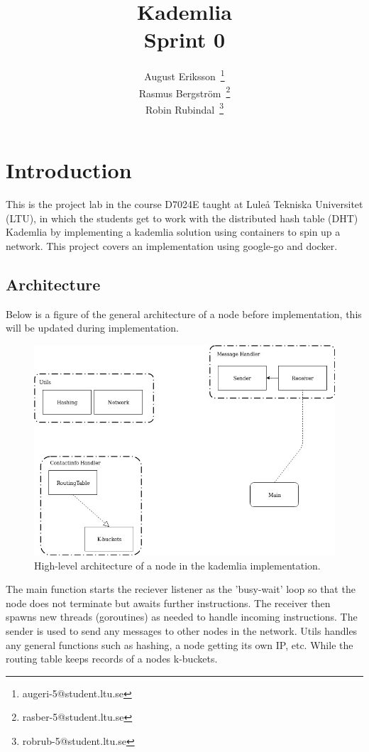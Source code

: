 \documentclass[a4paper]{article}
\title{Kademlia\\ \medskip{}
  \large{Sprint 0}
}
\author{
  August Eriksson~\thanks{augeri-5@student.ltu.se}\\
  Rasmus Bergström~\thanks{rasber-5@student.ltu.se}\\
  Robin Rubindal~\thanks{robrub-5@student.ltu.se}\\
}
\begin{document}
\maketitle
\newpage



\newpage

\section{Introduction}
This is the project lab in the course D7024E taught at Luleå Tekniska Universitet (LTU), in which the students get to work with the distributed hash table (DHT) Kademlia by implementing a kademlia solution using containers to spin up a network. This project covers an implementation using google-go and docker.

\subsection{Architecture}
Below is a figure of the general architecture of a node before implementation, this will be updated during implementation.
\begin{figure}[ht]
\centering
\includegraphics[width=\linewidth]{D7024E-architecture.jpg}
\caption{High-level architecture of a node in the kademlia implementation.}
\end{figure}

The main function starts the reciever listener as the 'busy-wait' loop so that the node does not terminate but awaits further instructions. The receiver then spawns new threads (goroutines) as needed to handle incoming instructions. The sender is used to send any messages to other nodes in the network. Utils handles any general functions such as hashing, a node getting its own IP, etc. While the routing table keeps records of a nodes k-buckets.
\end{document}
